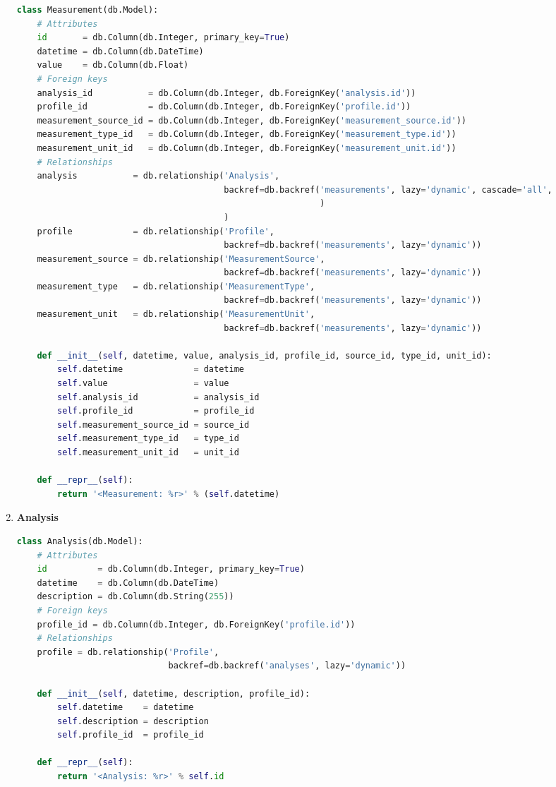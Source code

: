 \documentclass[a4paper,12pt]{article}
\begin{document}
\begin{enumerate}
\begin{lstlisting}[language=Python]
class Measurement(db.Model):
    # Attributes
    id       = db.Column(db.Integer, primary_key=True)
    datetime = db.Column(db.DateTime)
    value    = db.Column(db.Float)
    # Foreign keys
    analysis_id           = db.Column(db.Integer, db.ForeignKey('analysis.id'))
    profile_id            = db.Column(db.Integer, db.ForeignKey('profile.id'))
    measurement_source_id = db.Column(db.Integer, db.ForeignKey('measurement_source.id'))
    measurement_type_id   = db.Column(db.Integer, db.ForeignKey('measurement_type.id'))
    measurement_unit_id   = db.Column(db.Integer, db.ForeignKey('measurement_unit.id'))
    # Relationships
    analysis           = db.relationship('Analysis',
                                         backref=db.backref('measurements', lazy='dynamic', cascade='all',
                                                            )
                                         )
    profile            = db.relationship('Profile',
                                         backref=db.backref('measurements', lazy='dynamic'))
    measurement_source = db.relationship('MeasurementSource',
                                         backref=db.backref('measurements', lazy='dynamic'))
    measurement_type   = db.relationship('MeasurementType',
                                         backref=db.backref('measurements', lazy='dynamic'))
    measurement_unit   = db.relationship('MeasurementUnit',
                                         backref=db.backref('measurements', lazy='dynamic'))

    def __init__(self, datetime, value, analysis_id, profile_id, source_id, type_id, unit_id):
        self.datetime              = datetime
        self.value                 = value
        self.analysis_id           = analysis_id
        self.profile_id            = profile_id
        self.measurement_source_id = source_id
        self.measurement_type_id   = type_id
        self.measurement_unit_id   = unit_id

    def __repr__(self):
        return '<Measurement: %r>' % (self.datetime)
\end{lstlisting}
	
\item \textbf{Analysis}
\begin{lstlisting}[language=Python]
class Analysis(db.Model):
    # Attributes
    id          = db.Column(db.Integer, primary_key=True)
    datetime    = db.Column(db.DateTime)
    description = db.Column(db.String(255))
    # Foreign keys
    profile_id = db.Column(db.Integer, db.ForeignKey('profile.id'))
    # Relationships
    profile = db.relationship('Profile',
                              backref=db.backref('analyses', lazy='dynamic'))

    def __init__(self, datetime, description, profile_id):
        self.datetime    = datetime
        self.description = description
        self.profile_id  = profile_id

    def __repr__(self):
        return '<Analysis: %r>' % self.id
\end{lstlisting}
\end{enumerate}
\end{document}
